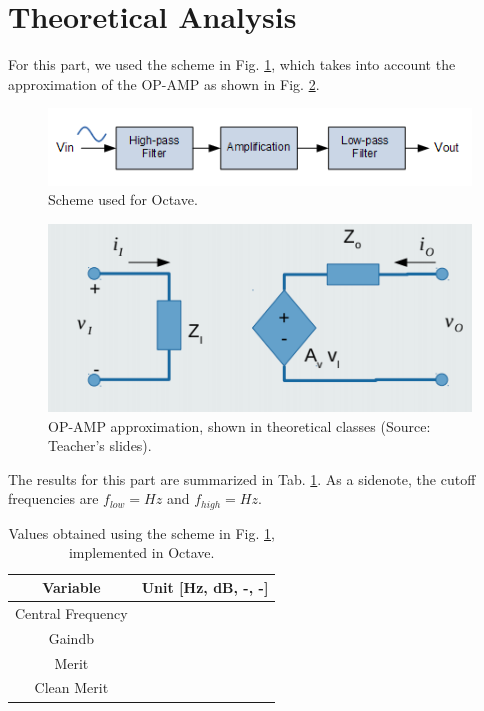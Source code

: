 \section{Theoretical Analysis}

For this part, we used the scheme in Fig. \ref{fig:joaoscheme}, which takes into account the approximation of the OP-AMP as shown in Fig. \ref{fig:approximation}.

\begin{figure}[H]
    \centering
    \includegraphics{esquemabunituh.PNG}
    \caption{Scheme used for Octave.}
    \label{fig:joaoscheme}
\end{figure}

\begin{figure}[H]
    \centering
    \includegraphics{slidespic.png}
    \caption{OP-AMP approximation, shown in theoretical classes (Source: Teacher's slides).}
    \label{fig:approximation}
\end{figure}

The results for this part are summarized in Tab. \ref{tab:valuesoctave}. As a sidenote, the cutoff frequencies are $f_{low} = Hz$ and $f_{high} = Hz$.

\begin{table}[H]
    \centering
    \begin{tabular}{|c|c|}
    	\hline
        Variable & Unit [Hz, dB, -, -]\\ 
        \hline
        Central Frequency & \\
        \hline
        Gaindb & \\
        \hline
        Merit & \\
        \hline
        Clean Merit & \\
        \hline
    \end{tabular}
    \caption{Values obtained using the scheme in Fig. \ref{fig:joaoscheme}, implemented in Octave.}
    \label{tab:valuesoctave}
\end{table}

